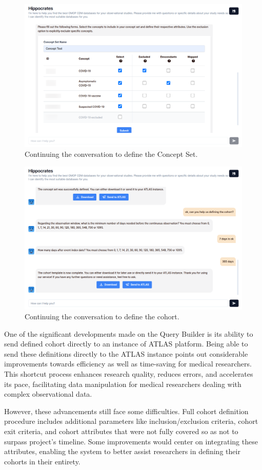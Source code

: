 \begin{figure}[H]
    \includegraphics[width=\textwidth]{figs/chapter5/chat2_blur.png}
    \centering
    \caption{Continuing the conversation to define the Concept Set.}
    \label{fig_chat2}
\end{figure}

\begin{figure}[H]
    \includegraphics[width=\textwidth]{figs/chapter5/chat3.png}
    \centering
    \caption{Continuing the conversation to define the cohort.}
    \label{fig_chat3}
\end{figure}


One of the significant developments made on the Query Builder is its ability to send defined cohort directly to an instance of ATLAS platform. Being able to send these definitions directly to the ATLAS instance points out considerable improvements towards efficiency as well as time-saving for medical researchers. This shortcut process enhances research quality, reduces errors, and accelerates its pace, facilitating data manipulation for medical researchers dealing with complex observational data.

However, these advancements still face some difficulties. Full cohort definition procedure includes additional parameters like inclusion/exclusion criteria, cohort exit criteria, and cohort attributes that were not fully covered so as not to surpass project's timeline. Some improvements would center on integrating these attributes, enabling the system to better assist researchers in defining their cohorts in their entirety.
